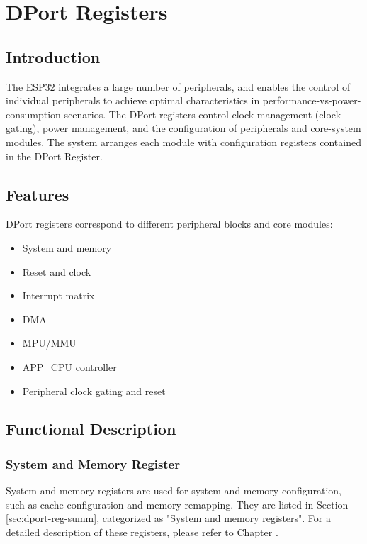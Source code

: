 \documentclass[main\_\_EN.tex]{subfiles}
\begin{document}
\hypertarget{dportreg}{}
\chapter{DPort Registers}
\label{mod:dportreg}

\section{Introduction}

The ESP32 integrates a large number of peripherals, and enables the control of individual peripherals to achieve optimal characteristics in performance-vs-power-consumption scenarios. The DPort registers control clock management (clock gating), power management, and the configuration of peripherals and core-system modules.
The system arranges each module with configuration registers contained in the DPort Register.

\section{Features}
DPort registers correspond to different peripheral blocks and core modules:

\begin{itemize}
    \item System and memory
    \item Reset and clock
    \item Interrupt matrix
    \item DMA
    \item MPU/MMU
    \item APP\_CPU controller
    \item Peripheral clock gating and reset
\end{itemize}

\section{Functional Description}

\subsection{System and Memory Register}
System and memory registers are used for system and memory configuration, such as cache configuration and memory remapping. They are listed in Section \ref{sec:dport-reg-summ}, categorized as "System and memory registers". For a detailed description of these registers, please refer to Chapter  \textit{}.
\end{document}

